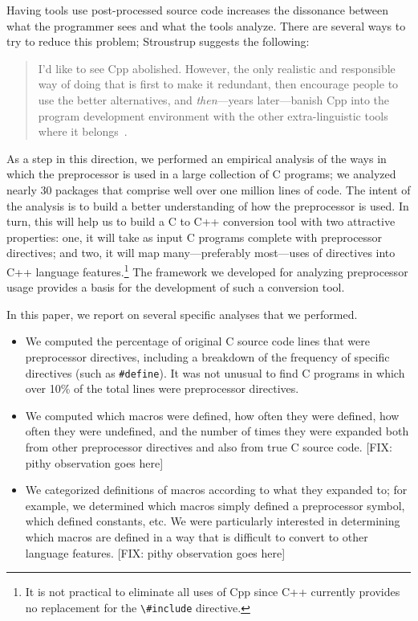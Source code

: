 Having tools use post-processed source code increases the dissonance
between what the programmer sees and what the tools analyze.  There
are several ways to try to reduce this problem; Stroustrup suggests
the following:
\begin{quote}
I'd like to see Cpp abolished.  However, the only realistic and
responsible way of doing that is first to make it redundant, then
encourage people to use the better alternatives, and {\em
then\/}---years later---banish Cpp into the program development
environment with the other extra-linguistic tools where it
belongs~\cite[p.~426]{Stroustrup-DesignEvolution}.
\end{quote}

As a step in this direction, we performed an empirical analysis of the
ways in which the preprocessor is used in a large collection of C
programs; we analyzed nearly 30 packages that comprise well over one
million lines of code.  The intent of the analysis is to build a
better understanding of how the preprocessor is used.  In turn, this
will help us to build a C to C++ conversion tool with two attractive
properties: one, it will take as input C programs complete with
preprocessor directives; and two, it will map many---preferably
most---uses of directives into C++ language features.\footnote{It is
not practical to eliminate all uses of Cpp since C++ currently
provides no replacement for the \verb+\#include+ directive.}  The
framework we developed for analyzing preprocessor usage provides a
basis for the development of such a conversion tool.

In this paper, we report on several specific analyses that we
performed.  
\begin{itemize}

\item We computed the percentage of original C source code lines that
were preprocessor directives, including a breakdown of the frequency
of specific directives (such as \verb+#define+).  It was not unusual
to find C programs in which over 10\% of the total lines were
preprocessor directives.

\item We computed which macros were defined, how often they were
defined, how often they were undefined, and the number of times they
were expanded both from other preprocessor directives and also from
true C source code.  [FIX: pithy observation goes here]

\item We categorized definitions of macros according to what they
      expanded to; for example, we determined which macros simply
      defined a preprocessor symbol, which defined constants, etc.  We
      were particularly interested in determining which macros are
      defined in a way that is difficult to convert to other language
      features.  [FIX: pithy observation goes here]

\end{itemize}

